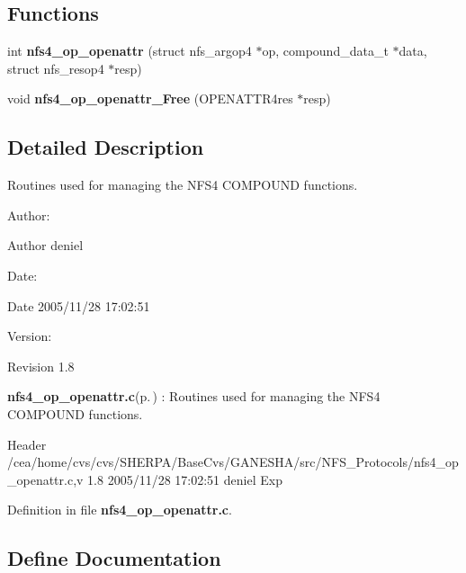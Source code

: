 \subsection*{Functions}
\begin{CompactItemize}
\item 
int {\bf nfs4\_\-op\_\-openattr} (struct nfs\_\-argop4 $\ast$op, compound\_\-data\_\-t $\ast$data, struct nfs\_\-resop4 $\ast$resp)
\item 
void {\bf nfs4\_\-op\_\-openattr\_\-Free} (OPENATTR4res $\ast$resp)
\end{CompactItemize}


\subsection{Detailed Description}
Routines used for managing the NFS4 COMPOUND functions. 

\begin{Desc}
\item[Author:]\begin{Desc}
\item[Author]deniel \end{Desc}
\end{Desc}
\begin{Desc}
\item[Date:]\begin{Desc}
\item[Date]2005/11/28 17:02:51 \end{Desc}
\end{Desc}
\begin{Desc}
\item[Version:]\begin{Desc}
\item[Revision]1.8 \end{Desc}
\end{Desc}
{\bf nfs4\_\-op\_\-openattr.c}{\rm (p.\,\pageref{nfs4__op__openattr_8c})} : Routines used for managing the NFS4 COMPOUND functions.

\begin{Desc}
\item[Header]/cea/home/cvs/cvs/SHERPA/Base\-Cvs/GANESHA/src/NFS\_\-Protocols/nfs4\_\-op\_\-openattr.c,v 1.8 2005/11/28 17:02:51 deniel Exp \end{Desc}


Definition in file {\bf nfs4\_\-op\_\-openattr.c}.

\subsection{Define Documentation}
